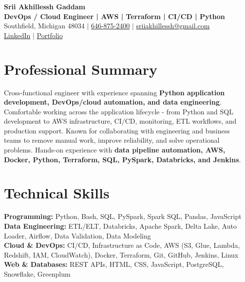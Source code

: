 \documentclass[letterpaper,10pt]{article}
\begin{document}
\fontsize{9.35pt}{10.45pt}\selectfont

\begin{center}
    {\LARGE \textbf{Srii Akhillessh Gaddam}} \\[-1pt]
    \textbf{DevOps / Cloud Engineer | AWS | Terraform | CI/CD | Python} \\[2pt]
    Southfield, Michigan 48034 $|$
    \href{tel:6468752400}{646-875-2400} $|$
    \href{mailto:sriiakhillessh@gmail.com}{sriiakhillessh@gmail.com} \\[1pt]
    \href{https://www.linkedin.com/in/srii-akhiilessh-gaddam-b48668191/}{LinkedIn} $|$
    \href{https://sriiakhillesshg.github.io/portfolio/}{Portfolio}
\end{center}
\vspace{-8pt}

\section{Professional Summary}
\small{Cross-functional engineer with experience spanning \textbf{Python application development, DevOps/cloud automation, and data engineering}. Comfortable working across the application lifecycle - from Python and SQL development to AWS infrastructure, CI/CD, monitoring, ETL workflows, and production support. Known for collaborating with engineering and business teams to remove manual work, improve reliability, and solve operational problems. Hands-on experience with \textbf{data pipeline automation, AWS, Docker, Python, Terraform, SQL, PySpark, Databricks, and Jenkins}.}

\section{Technical Skills}
\small{
\textbf{Programming:} Python, Bash, SQL, PySpark, Spark SQL, Pandas, JavaScript \\
\textbf{Data Engineering:} ETL/ELT, Databricks, Apache Spark, Delta Lake, Auto Loader, Airflow, Data Validation, Data Modeling \\
\textbf{Cloud \& DevOps:} CI/CD, Infrastructure as Code, AWS (S3, Glue, Lambda, Redshift, IAM, CloudWatch), Docker, Terraform, Git, GitHub, Jenkins, Linux \\
\textbf{Web \& Databases:} REST APIs, HTML, CSS, JavaScript, PostgreSQL, Snowflake, Greenplum
}
\end{document}
